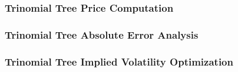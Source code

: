 \documentclass[10pt]{article}
\begin{document}
        \subsubsection{Trinomial Tree Price Computation} \label{appendix:source:q2:prices}

            
        
        \subsubsection{Trinomial Tree Absolute Error Analysis} \label{appendix:source:q2:abs_error}

            
        
        \subsubsection{Trinomial Tree Implied Volatility Optimization} \label{appendix:source:q2:imp_vol}

            

    
\end{document}
